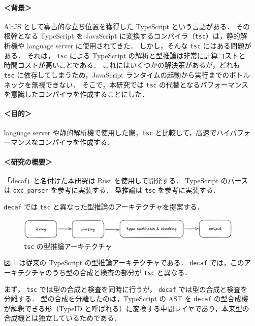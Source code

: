 \documentclass[dvipdfmx]{classes/tyukan}
\begin{document}
\paragraph{＜背景＞}
AltJS として寡占的な立ち位置を獲得した TypeScript という言語がある．
その根幹となる TypeScript を JavaScript に変換するコンパイラ（\texttt{tsc}）は，静的解析機や
language server に使用されてきた．
しかし，そんな \texttt{tsc} にはある問題がある．
それは， \texttt{tsc} による TypeScript の解析と型推論は非常に計算コストと時間コストが高いことである．
これにはいくつかの解決策があるが，どれも \texttt{tsc} に依存してしまうため，JavaScript
ランタイムの起動から実行までのボトルネックを無視できない．
そこで，本研究では \texttt{tsc} の代替となるパフォーマンスを意識したコンパイラを作成することにした．

\paragraph{＜目的＞}
language server や静的解析機で使用した際，\texttt{tsc} と比較して，高速でハイパフォーマンスなコンパイラを作成する．

\paragraph{＜研究の概要＞}
「decaf」と名付けた本研究は Rust を使用して開発する．
TypeScript のパースは \texttt{oxc\_parser} を参考に実装する．
型推論は \texttt{tsc} を参考に実装する．

\texttt{decaf} では \texttt{tsc} と異なった型推論のアーキテクチャを提案する．

\begin{figure}[h]
  \centering
  \includegraphics[width=0.9\columnwidth]{figures/type_check_arch.png}
  \caption{\texttt{tsc} の型推論アーキテクチャ}
  \label{fig:type_check_arch}
\end{figure}

図 \ref{fig:type_check_arch} は従来の TypeScript の型推論アーキテクチャである．
\texttt{decaf} では，このアーキテクチャのうち型の合成と検査の部分が \texttt{tsc} と異なる．

まず， \texttt{tsc} では型の合成と検査を同時に行うが， \texttt{decaf} では型の合成と検査を分離する．
型の合成を分離したのは，TypeScript の AST を \texttt{decaf} の型合成機が解釈できる形（TypeID
と呼ばれる）に変換する中間レイヤであり，本来型の合成機とは独立しているためである．
\end{document}
